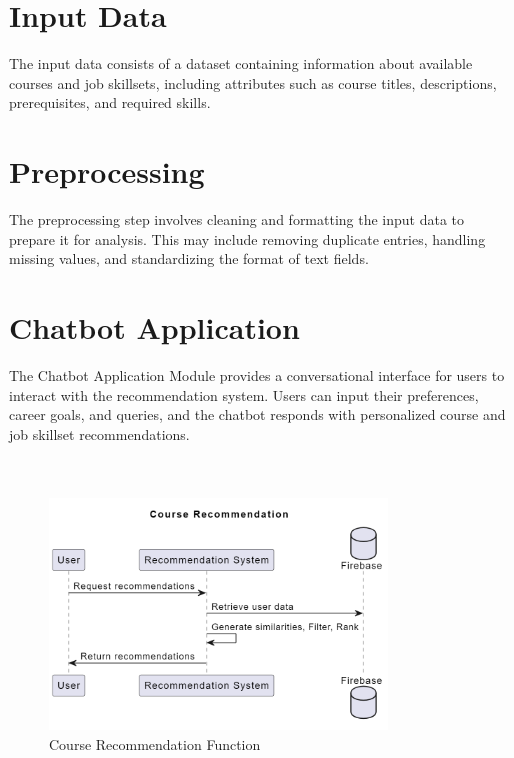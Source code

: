 \section{Input Data}

The input data consists of a dataset containing information about available courses and job skillsets, including attributes such as course titles, descriptions, prerequisites, and required skills.

\section{Preprocessing}

The preprocessing step involves cleaning and formatting the input data to prepare it for analysis. This may include removing duplicate entries, handling missing values, and standardizing the format of text fields.

\section{Chatbot Application}

The Chatbot Application Module provides a conversational interface for users to interact with the recommendation system. Users can input their preferences, career goals, and queries, and the chatbot responds with personalized course and job skillset recommendations.\\ \\ \\

\begin{figure}[b]
\centering
\includegraphics[width=0.8\textwidth]{3/course.png}
\caption{Course Recommendation Function}
\label{fig:course_recommendation}
\end{figure}


